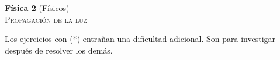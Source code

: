 \documentclass[11pt,spanish,a4paper]{article}
\begin{document}
\begin{center}
	\textbf{Física 2} (Físicos) \hfill {}\\
	\textsc{\LARGE Propagación de la luz}
\end{center}

Los ejercicios con (*) entrañan una dificultad adicional. Son para investigar después de resolver los demás.


\begin{enumerate}







\end{enumerate}
\end{document}
